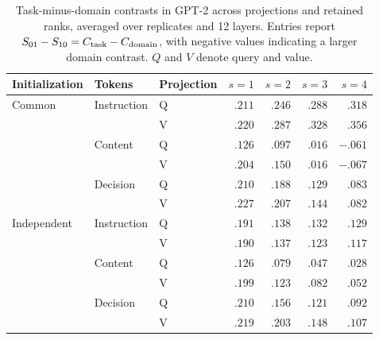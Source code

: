 \documentclass[11pt,letterpaper]{article}
\begin{document}
\begin{table}[htbp!]
\centering
\caption{Task-minus-domain contrasts in GPT-2 across projections and retained ranks, averaged over replicates and 12 layers. Entries report $S_{01}-S_{10}=C_{\rm task}-C_{\rm domain}$, with negative values indicating a larger domain contrast. $Q$ and $V$ denote query and value.}
\label{tab:app-gpt-rank-projection}
\small
\begin{tabular}{lllrrrr}
\toprule
Initialization & Tokens & Projection & $s=1$ & $s=2$ & $s=3$ & $s=4$ \\
\midrule
Common & Instruction & Q & $.211$ & $.246$ & $.288$ & $.318$ \\
       &             & V & $.220$ & $.287$ & $.328$ & $.356$ \\
       & Content     & Q & $.126$ & $.097$ & $.016$ & $-.061$ \\
       &             & V & $.204$ & $.150$ & $.016$ & $-.067$ \\
       & Decision    & Q & $.210$ & $.188$ & $.129$ & $.083$ \\
       &             & V & $.227$ & $.207$ & $.144$ & $.082$ \\
\midrule
Independent & Instruction & Q & $.191$ & $.138$ & $.132$ & $.129$ \\
            &             & V & $.190$ & $.137$ & $.123$ & $.117$ \\
            & Content     & Q & $.126$ & $.079$ & $.047$ & $.028$ \\
            &             & V & $.199$ & $.123$ & $.082$ & $.052$ \\
            & Decision    & Q & $.210$ & $.156$ & $.121$ & $.092$ \\
            &             & V & $.219$ & $.203$ & $.148$ & $.107$ \\
\bottomrule
\end{tabular}
\end{table}
\end{document}
